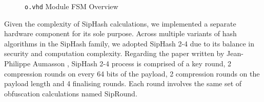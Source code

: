 \documentclass[a4paper]{report}
\newcommand{\code}{\texttt}
\begin{document}
\begin{figure}[h!]
\begin{minipage}{.45\textwidth}
  \caption{\code{o.vhd} Module FSM Overview}
  \label{fig:coreout-fsm}
\end{minipage}
\end{figure}

Given the complexity of SipHash calculations, we implemented a separate hardware component for its sole purpose. Across multiple variants of hash algorithms in the SipHash family, we adopted SipHash 2-4 due to its balance in security and computation complexity. Regarding the paper written by Jean-Philippe Aumasson \cite{aumasson-bernstein-2012}, SipHash 2-4 process is comprised of a key round, 2 compression rounds on every 64 bits of the payload, 2 compression rounds on the payload length and 4 finalising rounds. Each round involves the same set of obfuscation calculations named SipRound.
\end{document}
